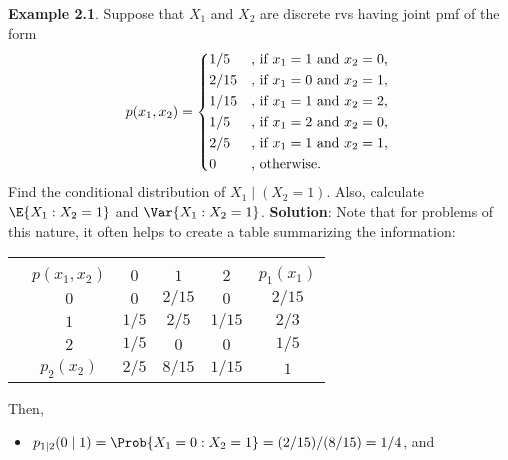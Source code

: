 \begin{Example}
    \textbf{Example 2.1}. Suppose that $ X_1 $ and $ X_2 $ are discrete rvs having joint pmf of the form
    \[ p(x_1,x_2)=\begin{cases*}
            1/5  & , if $ x_1=1 $ and $ x_2=0 $, \\
            2/15 & , if $ x_1=0 $ and $ x_2=1 $, \\
            1/15 & , if $ x_1=1 $ and $ x_2=2 $, \\
            1/5  & , if $ x_1=2 $ and $ x_2=0 $, \\
            2/5  & , if $ x_1=1 $ and $ x_2=1 $, \\
            0    & , otherwise.
        \end{cases*} \]
    Find the conditional distribution of $ X_1\mid (X_2=1) $. Also, calculate $ \E{X_1\given X_2=1} $ and
    $ \Var{X_1\given X_2=1} $.
    \tcblower{}
    \textbf{Solution}: Note that for problems of this nature, it often helps to create a table summarizing the information:
    \begin{center}
        \begin{NiceTabular}{cc|ccc|c}
            &                                                                                                                        \\%
            & $ p(x_1,x_2) $        & $ 0 $                      & $ 1 $                      & $ 2 $                      &$ p_1(x_1) $ \\
                       & $ 0 $                       & $ 0 $                      & $ 2/15 $                   & $ 0 $                      & $ 2/15 $                            \\%
            & $ 1 $                       & $ 1/5 $                    & $ 2/5 $                    & $ 1/15 $                   & $ 2/3 $                            \\
            & $ 2 $                       & $ 1/5 $                    & $ 0 $                      & $ 0 $                      & $ 1/5 $                            \\
            & $ p_2(x_2) $   & $ 2/5 $   & $ 8/15 $ & $ 1/15 $ & $ 1 $
        \end{NiceTabular}
    \end{center}
    Then,
    \begin{itemize}
        \item $ p_{1\mid 2}(0\mid 1)=\Prob{X_1=0\given X_2=1}=(2/15)/(8/15)=1/4 $, and

\end{itemize}
\end{Example}
